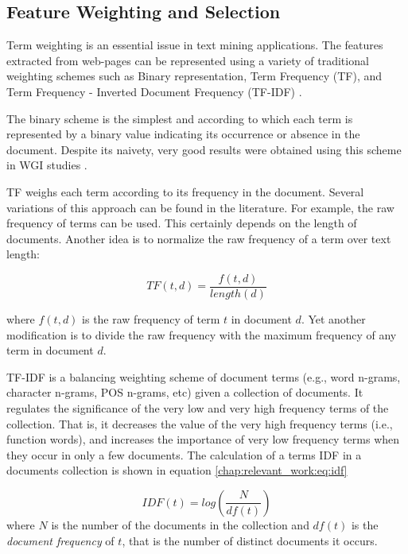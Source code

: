 \subsection{Feature Weighting and Selection}

Term weighting is an essential issue in text mining applications. The features extracted from web-pages can be represented using a variety of  traditional weighting schemes such as Binary representation, Term Frequency (TF), and Term Frequency - Inverted Document Frequency (TF-IDF) . 

The binary scheme is the simplest and according to which each term is represented by a binary value indicating its occurrence or absence in the document. Despite its naivety, very good results were obtained using this scheme in WGI studies .

TF weighs each term according to its frequency in the document. Several variations of this approach can be found in the literature. For example, the raw frequency of terms can be used. This certainly depends on the length of documents. Another idea is to normalize the raw frequency of a term over text length:

\begin{equation}
    TF(t,d) = \frac{f(t,d)}{length(d)}
\end{equation}

\nointend where $f(t,d)$ is the raw frequency of term $t$ in document $d$. Yet another modification is to divide the raw frequency with the maximum frequency of any term in document $d$.

TF-IDF is a balancing weighting scheme of document terms (e.g., word n-grams, character n-grams, POS n-grams, etc) given a collection of documents. It regulates the significance of the very low and very high frequency terms of the collection. That is, it decreases the value of the very high frequency terms (i.e., function words), and increases the importance of very low frequency terms when they occur in only a few documents. The calculation of a terms IDF in a documents collection is shown in equation \ref{chap:relevant_work:eq:idf}
 
 \begin{equation}\label{chap:relevant_work:eq:idf}
 	IDF(t) = log \left( \frac{N}{df(t)} \right)
 \end{equation}
\noindent
where $N$ is the number of the documents in the collection and $df(t)$ is the \textit{document frequency} of $t$, that is the number of distinct documents it occurs. 

